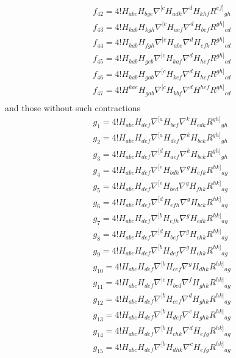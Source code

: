 \documentclass[a4paper,11pt]{article}
\begin{document}
\begin{equation}
\begin{aligned}
&f_{42}=4!H_{abc}H_{bge}\nabla^{[c}H_{adk}\nabla^dH_{khf}R^{ef]}{}_{gh}\\
&f_{43}=4!H_{kab}H_{kgh}\nabla^{[c}H_{aef}\nabla^dH_{bef}R^{gh]}{}_{cd}\\
&f_{44}=4!H_{kab}H_{fgh}\nabla^{[c}H_{abe}\nabla^dH_{efk}R^{gh]}{}_{cd}\\
&f_{45}=4!H_{kab}H_{geb}\nabla^{[c}H_{kaf}\nabla^dH_{hef}R^{gh]}{}_{cd}\\
&f_{46}=4!H_{kab}H_{gab}\nabla^{[c}H_{kef}\nabla^dH_{hef}R^{gh]}{}_{cd}\\
&f_{47}=4!H^{kae}H_{gab}\nabla^{[c}H_{kbf}\nabla^dH^{hef}R^{gh]}{}_{cd}\\
&{}
\end{aligned}
\end{equation}
and those without such contractions
\begin{equation}
\begin{aligned}
&g_1=4!H_{abc}H_{def}\nabla^{[a}H_{bef}\nabla^kH_{cdk}R^{gh]}{}_{gh}\\
&g_2=4!H_{abc}H_{def}\nabla^{[a}H_{def}\nabla^kH_{bck}R^{gh]}{}_{gh}\\
&g_3=4!H_{abc}H_{def}\nabla^{[d}H_{aef}\nabla^kH_{bck}R^{gh]}{}_{gh}\\
&g_4=4!H_{abc}H_{def}\nabla^{[e}H_{bdh}\nabla^gH_{cfk}R^{hk]}{}_{ag}\\
&g_5=4!H_{abc}H_{def}\nabla^{[e}H_{bcd}\nabla^gH_{fhk}R^{hk]}{}_{ag}\\
&g_6=4!H_{abc}H_{def}\nabla^{[d}H_{efh}\nabla^gH_{bck}R^{hk]}{}_{ag}\\
&g_7=4!H_{abc}H_{def}\nabla^{[b}H_{efh}\nabla^gH_{cdk}R^{hk]}{}_{ag}\\
&g_8=4!H_{abc}H_{def}\nabla^{[d}H_{bef}\nabla^gH_{chk}R^{hk]}{}_{ag}\\
&g_9=4!H_{abc}H_{def}\nabla^{[b}H_{def}\nabla^gH_{chk}R^{hk]}{}_{ag}\\
&g_{10}=4!H_{abc}H_{def}\nabla^{[b}H_{cef}\nabla^gH_{dhk}R^{hk]}{}_{ag}\\
&g_{11}=4!H_{abc}H_{def}\nabla^{[e}H_{bcd}\nabla^fH_{ghk}R^{hk]}{}_{ag}\\
&g_{12}=4!H_{abc}H_{def}\nabla^{[b}H_{cef}\nabla^dH_{ghk}R^{hk]}{}_{ag}\\
&g_{13}=4!H_{abc}H_{def}\nabla^{[b}H_{def}\nabla^cH_{ghk}R^{hk]}{}_{ag}\\
&g_{14}=4!H_{abc}H_{def}\nabla^{[b}H_{chk}\nabla^dH_{efg}R^{hk]}{}_{ag}\\
&g_{15}=4!H_{abc}H_{def}\nabla^{[b}H_{dhk}\nabla^cH_{efg}R^{hk]}{}_{ag}\\

\end{aligned}
\end{equation}
\end{document}
